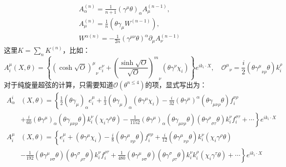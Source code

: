 \begin{equation}
	\begin{aligned}
		&A_\alpha^{(n)} = \frac{1}{n+1} (\gamma^\mu \theta)_\alpha A_\mu^{(n-1)}, \\
		&A_\mu^{(n)} = \frac{1}{n} (\theta \gamma_\mu W^{(n-1)}), \\
		&W^{\alpha(n)} = -\frac{1}{2n} (\gamma^{\mu\nu} \theta)^\alpha \partial_\mu A_\nu^{(n-1)}
	\end{aligned}
\end{equation}
这里$K=\sum_n K^{(n)}$，比如：
\begin{equation}
	A_i^\mu(X,\theta)=\left\{{(\cosh\sqrt{O})^\mu}_\nu e_i^\nu+{\left(\frac{\sinh\sqrt{O}}{\sqrt{O}}\right)^m}_\nu(\theta\gamma^\nu\chi_i)\right\}e^{i k_i\cdot X},\quad {\mathcal{O}^\mu}_\nu=\frac{i}{2}(\theta{\gamma^\mu}_{\nu\rho}\theta)k_i^\rho
\end{equation}
对于纯旋量超弦的计算，只需要知道$\mathcal{O}(\theta^{n\leq 4})$的项，显式写出为：
\begin{equation}
	\label{eq:5.48}
\begin{aligned}
		A_\alpha^i&(X,\theta)=\left\{\frac{1}{2}(\theta\gamma_\mu)_\alpha e_i^\mu+\frac{1}{3}(\theta\gamma_\mu)_\alpha(\theta\gamma^\mu\chi_i)-\frac{i}{32}(\theta\gamma^\mu)^\alpha(\theta\gamma_{\mu\nu\rho}\theta)f_i^{\nu\rho}\right.\\
	&\left.+\frac{i}{60}(\theta\gamma^\mu)_\alpha(\theta\gamma_{\mu\nu\rho}\theta)k_i^\nu(\chi_i\gamma^\rho\theta)-\frac{1}{1152}(\theta\gamma^\mu)_\alpha(\theta\gamma_{\mu\nu\rho}\theta)(\theta{\gamma^\rho}_{\sigma\tau}\theta)k_i^\nu f_i^{\sigma\tau}+\cdots\right\}e^{ik_i\cdot X}
\end{aligned}
\end{equation}
\begin{equation}
	\label{eq:5.49}
	\begin{aligned}
		A_i^\mu&(X,\theta)=\left\{e_i^\mu+(\theta\gamma^\mu\chi_i)-\frac{i}{8}(\theta{\gamma^\mu}_{\nu\rho}\theta)f_i^{\nu\rho}+\frac{i}{12}(\theta{\gamma^\mu}_{\nu\rho}\theta)k_i^\nu(\chi_i\gamma^\rho\theta)\right.\\
		&\left.-\frac{1}{192}(\theta{\gamma^\mu}_{\nu\sigma}\theta)(\theta{\gamma^\sigma}_{\rho\tau}\theta)k_i^\nu f_i^{\rho\tau}+\frac{1}{480}(\theta{\gamma^\mu}_{\nu\sigma}\theta)(\theta{\gamma^\sigma}_{\rho\tau}\theta)k_i^\nu k_i^\rho(\chi_i\gamma^\tau\theta)+\cdots\right\}e^{ik_i\cdot X}
	\end{aligned}
\end{equation}
